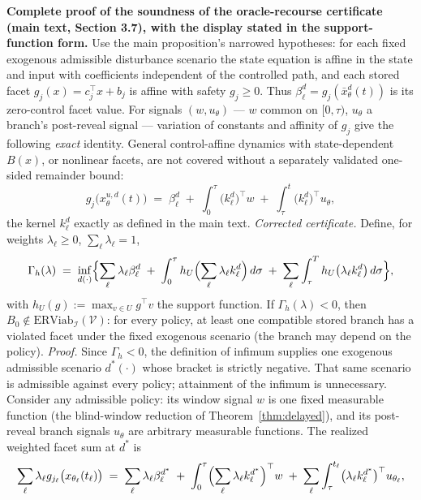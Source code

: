 \documentclass[11pt]{article}
\theoremstyle{definition}
\begin{document}
\bigskip
\noindent\textbf{Complete proof of the soundness of the oracle-recourse
certificate (main text, Section 3.7), with the display stated in the
support-function form.}
Use the main proposition's narrowed hypotheses: for each fixed exogenous
admissible disturbance scenario the state equation is affine in the state
and input with coefficients independent of the controlled path, and each
stored facet \(g_j(x)=c_j^\top x+b_j\) is affine with safety
\(g_j\ge0\). Thus \(\beta_\ell^d=g_j(\bar x_\theta^d(t))\) is its
zero-control facet value. For signals \((w,u_\theta)\) --- \(w\) common
on \([0,\tau)\), \(u_\theta\) a branch's post-reveal signal ---
variation of constants and affinity of \(g_j\) give the following
\emph{exact} identity. General control-affine dynamics with
state-dependent \(B(x)\), or nonlinear facets, are not covered without
a separately validated one-sided remainder bound:
\[
g_{j}\bigl(x_{\theta}^{u, d}(t)\bigr) \;=\; \beta_{\ell}^{d}
\;+\; \int_{0}^{\tau} \bigl(k_{\ell}^{d}\bigr)^{\top} w
\;+\; \int_{\tau}^{t} \bigl(k_{\ell}^{d}\bigr)^{\top} u_{\theta},
\]
the kernel \(k_{\ell}^{d}\) exactly as defined in the main text.
\emph{Corrected certificate.} Define, for weights
\(\lambda_{\ell} \ge 0\), \(\sum_{\ell} \lambda_{\ell} = 1\),
\[
\Gamma_{h}(\lambda) \;=\; \inf_{d(\cdot)} \Bigl\{ \sum_{\ell}
\lambda_{\ell} \beta_{\ell}^{d} \;+\; \int_{0}^{\tau}
h_{U}\Bigl(\sum_{\ell} \lambda_{\ell} k_{\ell}^{d}\Bigr)\, d\sigma
\;+\; \sum_{\ell} \int_{\tau}^{T} h_{U}\bigl(\lambda_{\ell}
k_{\ell}^{d}\bigr)\, d\sigma \Bigr\},
\]
with \(h_{U}(g) := \max_{v \in U} g^{\top} v\) the support function. If
\(\Gamma_{h}(\lambda) < 0\), then \(B_{0} \notin
\mathrm{ERViab}_{\mathcal{I}}(\mathcal{V})\): for every policy,
at least one compatible stored branch has a violated facet under the
fixed exogenous scenario (the branch may depend on the policy).
\emph{Proof.} Since \(\Gamma_h<0\), the definition of infimum supplies
one exogenous admissible scenario \(d^{*}(\cdot)\) whose bracket is
strictly negative. That same scenario is admissible against every
policy; attainment of the infimum is unnecessary. Consider any
admissible policy: its window signal \(w\) is one fixed measurable
function (the blind-window reduction of
Theorem~\ref{thm:delayed}), and its post-reveal branch signals
\(u_{\theta}\) are arbitrary measurable functions. The realized
weighted facet sum at \(d^{*}\) is
\[
\sum_{\ell} \lambda_{\ell} g_{j_{\ell}}\bigl(x_{\theta_{\ell}}(t_{\ell})
\bigr) \;=\; \sum_{\ell} \lambda_{\ell} \beta_{\ell}^{d^{*}}
\;+\; \int_{0}^{\tau} \Bigl(\sum_{\ell} \lambda_{\ell}
k_{\ell}^{d^{*}}\Bigr)^{\top} w \;+\; \sum_{\ell} \int_{\tau}^{t_{\ell}}
\bigl(\lambda_{\ell} k_{\ell}^{d^{*}}\bigr)^{\top} u_{\theta_{\ell}},
\]
\end{document}
